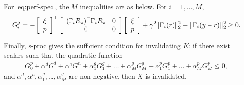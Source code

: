\documentclass[11pt, onecolumn]{article}
\begin{document}
For \eqref{eq:perf-spec}, the $M$ inequalities are as below. For $i=1,\dots, M$,
\begin{align*}
  G^g_i= -   \left[ \begin{array}[c]{c} \xi\\ p \end{array} \right]^\top
    \left[ \begin{array}[c]{cc} (\Gamma_{i}R_z)^\top \Gamma_{i}R_z  &0 \\ 0 & 0  \end{array} \right]
  \left[ \begin{array}[c]{c} \xi\\ p \end{array} \right]
  + \gamma^2 \|\Gamma_{i}(r)\|_2^2 -   \|\Gamma_{i}(y-r)\|_2^2 \ge 0.
\end{align*}

Finally, s-proc gives the sufficient condition for invalidating $K$: if there exist scalars such
that the quadratic function
\begin{align*}
  G^p_0 + \alpha^d G^d + \alpha^n G^n  + \alpha^g_1 G^g_1
  + \dots+ \alpha^g_M G^g_M   + \alpha^p_1 G^p_1 +\dots + \alpha^p_M G^p_M\le  0,
\end{align*}
and $\alpha^d, \alpha^n,\alpha^g_1,\dots, \alpha^g_M$ are non-negative, then $K$ is invalidated.
\end{document}
